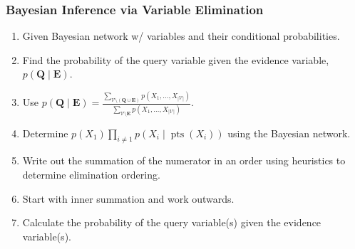 

\subsubsection{Bayesian Inference via Variable Elimination}
\begin{process}
    \begin{enumerate}
        \item Given Bayesian network w/ variables and their conditional probabilities.
        \item Find the probability of the query variable given the evidence variable, $p(\mathbf{Q} \mid \mathbf{E})$.
        \item Use $p(\mathbf{Q} \mid \mathbf{E}) = \frac{\sum_{\mathcal{V} \setminus (\mathbf{Q} \cup \mathbf{E})} p(X_1, \dots, X_{|\mathcal{V}|})}{\sum_{\mathcal{V} \setminus \mathbf{E}} p(X_1, \dots, X_{|\mathcal{V}|})}$.
        \item Determine $p(X_1) \prod_{i \neq 1} p(X_i \mid \operatorname{pts}(X_i))$ using the Bayesian network. 
        \item Write out the summation of the numerator in an order using heuristics to determine elimination ordering. 
        \item Start with inner summation and work outwards.
        \item Calculate the probability of the query variable(s) given the evidence variable(s).
    \end{enumerate}
\end{process}

